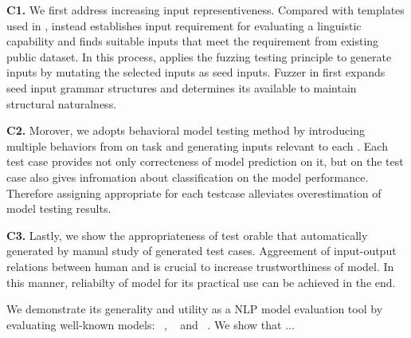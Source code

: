 
\noindent \textbf{C1.} We first address increasing input
representiveness. Compared with templates used in \Cklst, \tool
instead establishes input requirement for evaluating a linguistic
capability and finds suitable inputs that meet the requirement from
existing public dataset. In this process, \tool applies the fuzzing
testing principle to generate inputs by mutating the selected inputs
as seed inputs. Fuzzer in \tool first expands seed input grammar
structures and determines its available \pos to maintain structural
naturalness.


\noindent \textbf{C2.} Morover, we adopts behavioral model testing
method by introducing multiple behaviors from \lcs on \sa task and
generating inputs relevant to each \lc. Each test case provides not
only correcteness of model prediction on it, but \lc on the test case
also gives infromation about classification on the model
performance. Therefore assigning appropriate \lc for each testcase
alleviates overestimation of model testing results.

\noindent \textbf{C3.} Lastly, we show the appropriateness of test
orable that \tool automatically generated by manual study of generated
test cases. Aggreement of input-output relations between human and
\tool is crucial to increase trustworthiness of model. In this manner,
reliabilty of model for its practical use can be achieved in the end.


We demonstrate its generality and utility as a NLP model evaluation
tool by evaluating well-known \sa models: \Bert~\cite{devlin2019bert},
\Roberta~\cite{liu2019roberta} and \Dbert~\cite{sanh2019distilbert}.
We show that ...



